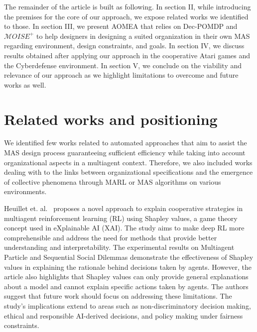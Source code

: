 \documentclass[runningheads]{llncs}
\begin{document}
The remainder of the article is built as following.
In section II, while introducing the premises for the core of our approach, we expose related works we identified to those.
In section III, we present AOMEA that relies on Dec-POMDP and $\mathcal{M}OISE^+$ to help designers in designing a suited organization in their own MAS regarding environment, design constraints, and goals.
In section IV, we discuss results obtained after applying our approach in the cooperative Atari games and the Cyberdefense environment.
In section V, we conclude on the viability and relevance of our approach as we highlight limitations to overcome and future works as well.


\section{Related works and positioning}




We identified few works related to automated approaches that aim to assist the MAS design process guaranteeing sufficient efficiency while taking into account organizational aspects in a multiagent context. Therefore, we also included works dealing with to the links between organizational specifications and the emergence of collective phenomena through MARL or MAS algorithms on various environments.

Heuillet et. al.~\cite{Heuillet2022} proposes a novel approach to explain cooperative strategies in multiagent reinforcement learning (RL) using Shapley values, a game theory concept used in eXplainable AI (XAI). The study aims to make deep RL more comprehensible and address the need for methods that provide better understanding and interpretability. The experimental results on Multiagent Particle and Sequential Social Dilemmas demonstrate the effectiveness of Shapley values in explaining the rationale behind decisions taken by agents. However, the article also highlights that Shapley values can only provide general explanations about a model and cannot explain specific actions taken by agents. The authors suggest that future work should focus on addressing these limitations. The study's implications extend to areas such as non-discriminatory decision making, ethical and responsible AI-derived decisions, and policy making under fairness constraints.
\end{document}
